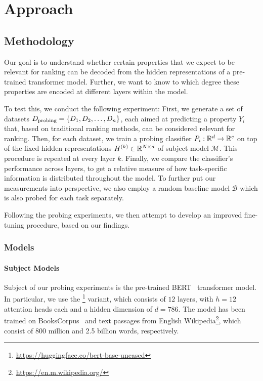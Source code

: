 \chapter{Approach}
\label{chap:approach}

\section{Methodology}
Our goal is to understand whether certain properties that we expect to be relevant for ranking can be decoded from the hidden representations of a pre-trained transformer model. Further, we want to know to which degree these properties are encoded at different layers within the model.

To test this, we conduct the following experiment: First, we generate a set of datasets $D_{\text{probing}}=\{D_1, D_2, \dots, D_n \}$, each aimed at predicting a property $Y_i$ that, based on traditional ranking methods, can be considered relevant for ranking. Then, for each dataset, we train a probing classifier $P_i: \mathbb{R}^d \rightarrow \mathbb{R}^c$ on top of the fixed hidden representations $H^{(k)} \in \mathbb{R}^{N \times d}$ of subject model $\mathcal{M}$. This procedure is repeated at every layer $k$. Finally, we compare the classifier's performance across layers, to get a relative measure of how task-specific information is distributed throughout the model. To further put our measurements into perspective, we also employ a random baseline model $\mathcal{B}$ which is also probed for each task separately.

Following the probing experiments, we then attempt to develop an improved fine-tuning procedure, based on our findings.

\subsection{Models}
\subsubsection{Subject Models}
Subject of our probing experiments is the pre-trained BERT~\cite{devlin-etal-2019-bert} transformer model. In particular, we use the \footnote{\url{https://huggingface.co/bert-base-uncased}} variant, which consists of $12$ layers, with $h=12$ attention heads each and a hidden dimension of $d=786$. The model has been trained on BooksCorpus~\cite{7410368} and text passages from English Wikipedia\footnote{\url{https://en.m.wikipedia.org/}}, which consist of 800 million and 2.5 billion words, respectively.

